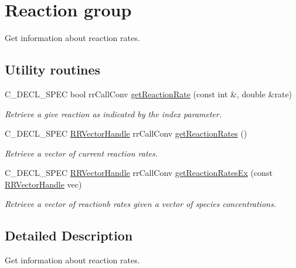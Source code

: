 \hypertarget{group__reaction}{
\section{\-Reaction group}
\label{group__reaction}
}


\-Get information about reaction rates.  


\subsection*{\-Utility routines}
\begin{DoxyCompactItemize}
\item 
\-C\-\_\-\-D\-E\-C\-L\-\_\-\-S\-P\-E\-C bool rr\-Call\-Conv \hyperlink{group__utility_ga0a7be404315c6001627ee26e738e11e2}{get\-Reaction\-Rate} (const int \&, double \&rate)
\begin{DoxyCompactList}\small\item\em \-Retrieve a give reaction as indicated by the index parameter. \end{DoxyCompactList}\item 
\-C\-\_\-\-D\-E\-C\-L\-\_\-\-S\-P\-E\-C \hyperlink{rr__c__types_8h_aea46a16752b0ae2cd95c009030ee630e}{\-R\-R\-Vector\-Handle} \*
rr\-Call\-Conv \hyperlink{group__utility_ga86d544bcf3eeaa4698a60123a3da69aa}{get\-Reaction\-Rates} ()
\begin{DoxyCompactList}\small\item\em \-Retrieve a vector of current reaction rates. \end{DoxyCompactList}\item 
\-C\-\_\-\-D\-E\-C\-L\-\_\-\-S\-P\-E\-C \hyperlink{rr__c__types_8h_aea46a16752b0ae2cd95c009030ee630e}{\-R\-R\-Vector\-Handle} \*
rr\-Call\-Conv \hyperlink{group__utility_gaa03d9414ddeb177a76365dd5b2d0042e}{get\-Reaction\-Rates\-Ex} (const \hyperlink{rr__c__types_8h_aea46a16752b0ae2cd95c009030ee630e}{\-R\-R\-Vector\-Handle} vec)
\begin{DoxyCompactList}\small\item\em \-Retrieve a vector of reactionb rates given a vector of species concentrations. \end{DoxyCompactList}\end{DoxyCompactItemize}


\subsection{\-Detailed \-Description}
\-Get information about reaction rates. 

